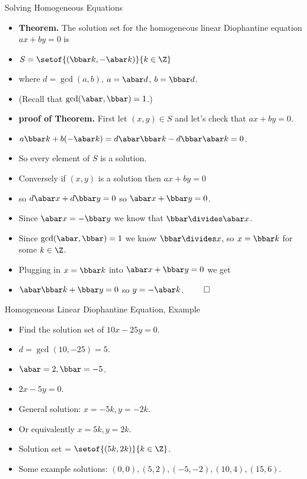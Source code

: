 \documentclass{beamer}
\begin{document}
\begin{frame}{Solving Homogeneous Equations}

\begin{itemize}
  \item \textbf{Theorem.} The solution set for the homogeneous linear Diophantine equation
  $ax + by =0$ is
  \item $S = \setof{(\bbar k, -\abar k)}{k\in \Z}$
  \item where $d=\gcd(a,b)$, $a=\abar d$, $b = \bbar d$.
  \item (Recall that $\gcd(\abar,\bbar)=1$.)
  \item \textbf{proof of Theorem.} First let $(x,y)\in S$ and let's check that $ax+by=0$.
  \item $a \bbar k + b(-\abar k) = d\abar\bbar k  - d\bbar\abar k = 0$.
  \item So every element of $S$ is a solution.
  \item Conversely if $(x,y)$ is a solution then $ax+by=0$
  \item so $d\abar x + d \bbar y = 0$ so $\abar x + \bbar y = 0$.
  \item Since $\abar x = -\bbar y$ we know that $\bbar \divides \abar x$.
  \item Since $\gcd(\abar,\bbar) = 1$ we know  $\bbar\divides x$, so $x=\bbar k$ for some $k\in\Z$.
  \item Plugging in $x=\bbar k$ into $\abar x + \bbar y = 0$ we get
  \item $\abar \bbar k + \bbar y = 0$ so $y=-\abar k$. $\qed$
\end{itemize}

\end{frame}


\begin{frame}{Homogeneous Linear Diophantine Equation, Example}

\begin{itemize}
  \item Find the solution set of $10x - 25y = 0$.
  \item $d = \gcd(10, -25) = 5$.
  \item $\abar = 2, \bbar = -5$.
  \item $2x - 5y = 0$.
  \item General solution: $x=-5k, y=-2k$.
  \item Or equivalently $x=5k, y=2k$.
  \item Solution set = $\setof{(5k, 2k)}{k\in\Z}$.
  \item Some example solutions: $(0,0), (5,2),(-5,-2), (10,4), (15, 6)$.
\end{itemize}

\end{frame}
\end{document}
